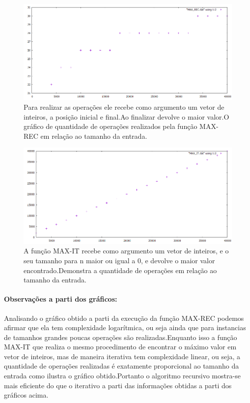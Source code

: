 \documentclass[12pt]{article}
\begin{document}
	\begin{figure}[ht]
		\centering
		\includegraphics[width=0.7\linewidth]{Graficos/MAX_REC}
		\caption[MAX-REC]{Para realizar as 
			operações ele recebe como argumento um vetor de inteiros,
			a posição inicial e final.Ao finalizar devolve o maior valor.O gráfico de quantidade de operações realizados pela função MAX-REC em relação ao tamanho da entrada.}
		\label{fig:maxrec}
	\end{figure}
	
	
	
	\begin{figure}[ht]
		\centering
		\includegraphics[width=0.7\linewidth]{Graficos/MAX_IT}
		\caption[Gráfico da função MAX-IT]{A função MAX-IT recebe como argumento um vetor de inteiros, e o seu tamanho para n maior ou igual a 0, e devolve o maior valor encontrado.Demonstra a quantidade de operações em relação ao tamanho da entrada.}
		\label{fig:maxit}
	\end{figure}
	
	\paragraph{Observações a parti dos gráficos: } Analisando o gráfico obtido a parti da execução da função MAX-REC podemos afirmar que ela tem complexidade logarítmica, ou seja ainda que para instancias de tamanhos grandes poucas operações são realizadas.Enquanto isso a função MAX-IT que realiza o mesmo procedimento de encontrar o máximo valor em vetor de inteiros, mas de maneira iterativa tem complexidade linear, ou seja, a quantidade de operações realizadas é exatamente proporcional ao tamanho da entrada como ilustra o gráfico obtido.Portanto o algoritmo recursivo mostra-se mais eficiente do que o iterativo a parti das informações obtidas a parti dos gráficos acima.
	
\end{document}
